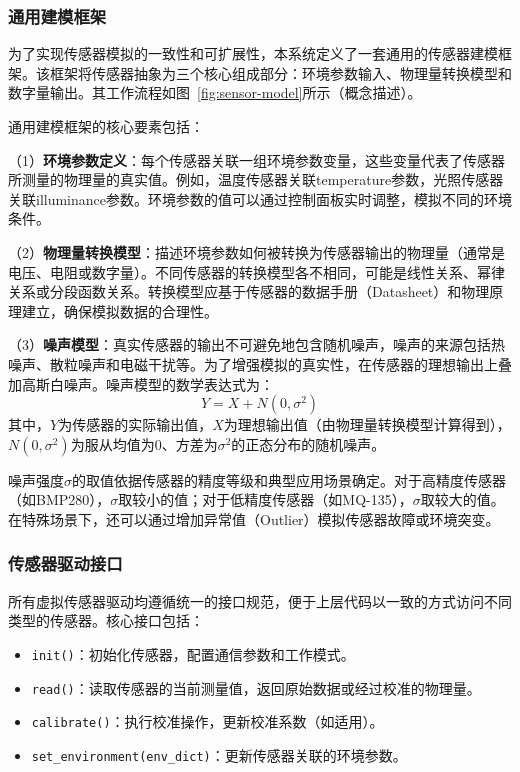 \documentclass[12pt,a4paper]{ctexart}
\begin{document}
\subsubsection{通用建模框架}

为了实现传感器模拟的一致性和可扩展性，本系统定义了一套通用的传感器建模框架。该框架将传感器抽象为三个核心组成部分：环境参数输入、物理量转换模型和数字量输出。其工作流程如图~\ref{fig:sensor-model}所示（概念描述）。

通用建模框架的核心要素包括：

（1）\textbf{环境参数定义}：每个传感器关联一组环境参数变量，这些变量代表了传感器所测量的物理量的真实值。例如，温度传感器关联temperature参数，光照传感器关联illuminance参数。环境参数的值可以通过控制面板实时调整，模拟不同的环境条件。

（2）\textbf{物理量转换模型}：描述环境参数如何被转换为传感器输出的物理量（通常是电压、电阻或数字量）。不同传感器的转换模型各不相同，可能是线性关系、幂律关系或分段函数关系。转换模型应基于传感器的数据手册（Datasheet）和物理原理建立，确保模拟数据的合理性。

（3）\textbf{噪声模型}：真实传感器的输出不可避免地包含随机噪声，噪声的来源包括热噪声、散粒噪声和电磁干扰等。为了增强模拟的真实性，在传感器的理想输出上叠加高斯白噪声。噪声模型的数学表达式为：
\begin{equation}
    Y = X + N(0, \sigma^2)
    \label{eq:noise}
\end{equation}
其中，$Y$为传感器的实际输出值，$X$为理想输出值（由物理量转换模型计算得到），$N(0, \sigma^2)$为服从均值为0、方差为$\sigma^2$的正态分布的随机噪声。

噪声强度$\sigma$的取值依据传感器的精度等级和典型应用场景确定。对于高精度传感器（如BMP280），$\sigma$取较小的值；对于低精度传感器（如MQ-135），$\sigma$取较大的值。在特殊场景下，还可以通过增加异常值（Outlier）模拟传感器故障或环境突变。

\subsubsection{传感器驱动接口}

所有虚拟传感器驱动均遵循统一的接口规范，便于上层代码以一致的方式访问不同类型的传感器。核心接口包括：

\begin{itemize}[leftmargin=2em]
    \item \texttt{init()}：初始化传感器，配置通信参数和工作模式。
    \item \texttt{read()}：读取传感器的当前测量值，返回原始数据或经过校准的物理量。
    \item \texttt{calibrate()}：执行校准操作，更新校准系数（如适用）。
    \item \texttt{set\_environment(env\_dict)}：更新传感器关联的环境参数。
\end{itemize}
\end{document}
